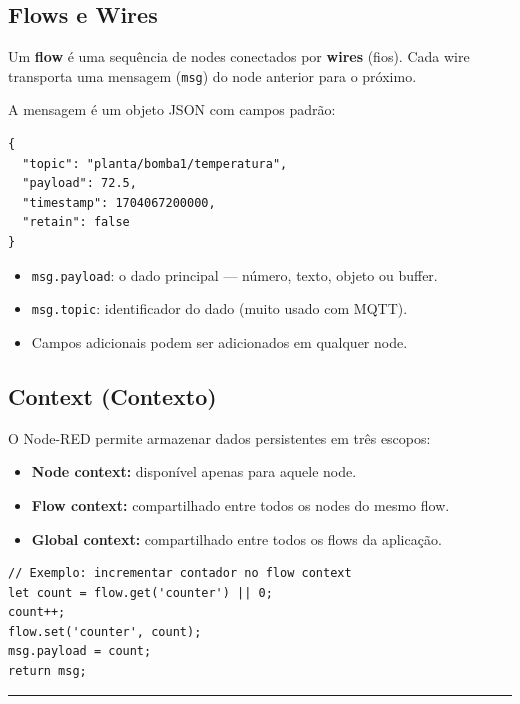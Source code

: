 \subsection{Flows e Wires}\label{flows-e-wires}

Um \textbf{flow} é uma sequência de nodes conectados por \textbf{wires} (fios). Cada wire transporta uma mensagem (\passthrough{\lstinline!msg!}) do node anterior para o próximo.

A mensagem é um objeto JSON com campos padrão:

\begin{lstlisting}
{
  "topic": "planta/bomba1/temperatura",
  "payload": 72.5,
  "timestamp": 1704067200000,
  "retain": false
}
\end{lstlisting}

\begin{itemize}
\tightlist
\item
  \passthrough{\lstinline!msg.payload!}: o dado principal --- número, texto, objeto ou buffer.
\item
  \passthrough{\lstinline!msg.topic!}: identificador do dado (muito usado com MQTT).
\item
  Campos adicionais podem ser adicionados em qualquer node.
\end{itemize}

\subsection{Context (Contexto)}\label{context-contexto}

O Node-RED permite armazenar dados persistentes em três escopos:

\begin{itemize}
\tightlist
\item
  \textbf{Node context:} disponível apenas para aquele node.
\item
  \textbf{Flow context:} compartilhado entre todos os nodes do mesmo flow.
\item
  \textbf{Global context:} compartilhado entre todos os flows da aplicação.
\end{itemize}

\begin{lstlisting}
// Exemplo: incrementar contador no flow context
let count = flow.get('counter') || 0;
count++;
flow.set('counter', count);
msg.payload = count;
return msg;
\end{lstlisting}

\begin{center}\rule{0.5\linewidth}{0.5pt}\end{center}

